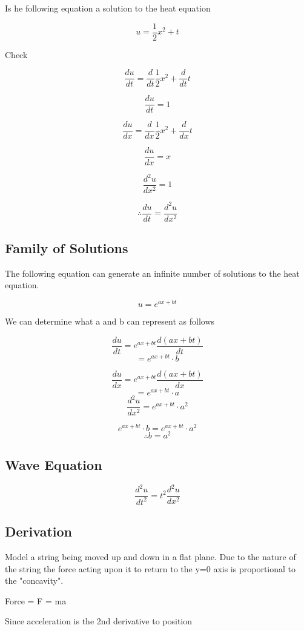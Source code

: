 \documentclass[10pt,a4paper]{report}
\begin{document}
Is he following equation a solution to the heat equation

\[ u = \frac{1}{2} x^2 + t \]

Check

\[ \frac{du}{dt} = \frac{d}{dt}\frac{1}{2}x^2 + \frac{d}{dt} t\]

\[ \frac{du}{dt} = 1\]

\[ \frac{du}{dx} = \frac{d}{dx}\frac{1}{2}x^2 + \frac{d}{dx} t\]

\[ \frac{du}{dx} = x \]

\[ \frac{d^2u}{dx^2} = 1 \]



\[\therefore \frac{du}{dt} = \frac{d^2u}{dx^2} \]
\subsection*{Family of Solutions}

The following equation can generate an infinite number of solutions to the heat equation.

\[ u = e ^{ax + bt}\]

We can determine what a and b can represent as follows

\[ \frac{du}{dt} = e ^{ax + bt} \frac{d(ax+bt)}{dt}\]
\[ = e^{ax + bt}\cdot b\]

\[ \frac{du}{dx} = e ^{ax + bt}\frac{d(ax+bt)}{dx}\]
\[ = e^{ax + bt}\cdot a\]
\[ \frac{d^2u}{dx^2}=e^{ax + bt}\cdot a^2\]

\[ e^{ax + bt}\cdot b=e^{ax + bt}\cdot a^2\]
\[ \therefore b=a^2\]

\subsection{Wave Equation}

\begin{equation}
	\frac{d^2u}{dt^2} = t^2 \frac{d^2u}{dx^2}
\end{equation}

\subsection*{Derivation}

Model a string being moved up and down in a flat plane. Due to the nature of the string the force acting upon it to return to the y=0 axis is proportional to the "concavity".

Force = F = ma

Since acceleration is the 2nd derivative to position
\end{document}
